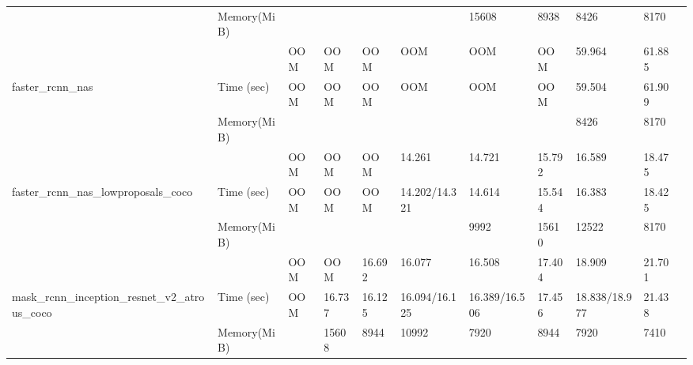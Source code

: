 \documentclass[conference]{IEEEtran}
\begin{document}
\begin{table}[]
{\begin{tabular}{lllllllllll}
                                                                & Memory(MiB)   &                     &                    &                   &                   & 15608            & 8938   & 8426              & 8170        &          \\
                                                                &               & OOM                 & OOM                & OOM               & OOM               & OOM              & OOM    & 59.964            & 61.885      &          \\
faster\_rcnn\_nas                                               & Time (sec)    & OOM                 & OOM                & OOM               & OOM               & OOM              & OOM    & 59.504            & 61.909      &          \\
                                                                & Memory(MiB)   &                     &                    &                   &                   &                  &        & 8426              & 8170        &          \\
                                                                &               & OOM                 & OOM                & OOM               & 14.261            & 14.721           & 15.792 & 16.589            & 18.475      &          \\
faster\_rcnn\_nas\_lowproposals\_coco                           & Time (sec)    & OOM                 & OOM                & OOM               & 14.202/14.321     & 14.614           & 15.544 & 16.383            & 18.425      &          \\
                                                                & Memory(MiB)   &                     &                    &                   &                   & 9992             & 15610  & 12522             & 8170        &          \\
                                                                &               & OOM                 & OOM                & 16.692            & 16.077            & 16.508           & 17.404 & 18.909            & 21.701      &          \\
mask\_rcnn\_inception\_resnet\_v2\_atrous\_coco                 & Time (sec)    & OOM                 & 16.737             & 16.125            & 16.094/16.125     & 16.389/16.506    & 17.456 & 18.838/18.977     & 21.438      &          \\
                                                                & Memory(MiB)   &                     & 15608              & 8944              & 10992             & 7920             & 8944   & 7920              & 7410        &          \\

\end{tabular}}
\end{table}
\end{document}
